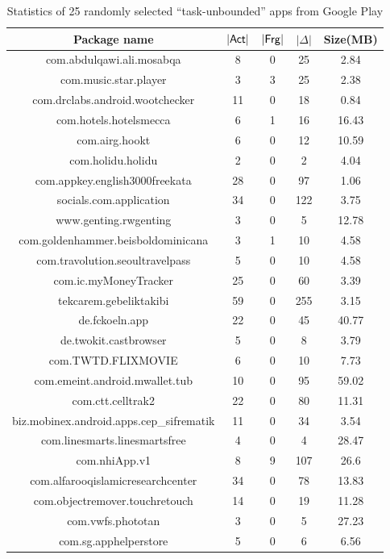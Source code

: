 	\begin{table}[htbp] 
		\begin{center}   
			\begin{tabular}{|c|c|c|c|c|}   
				\hline   \textbf{Package name} &\textbf{$|{\sf Act}|$} & \textbf{$|{\sf Frg}|$} & \textbf{$|\Delta|$} & \textbf{Size(MB)} \\   
			\hline    com.abdulqawi.ali.mosabqa & 8& 0& 25& 2.84  \\ 
			\hline    com.music.star.player & 3& 3& 25& 2.38  \\ 
			\hline     com.drclabs.android.wootchecker & 11& 0& 18& 0.84  \\ 
			\hline     com.hotels.hotelsmecca & 6& 1& 16& 16.43  \\ 
			\hline    com.airg.hookt & 6& 0& 12& 10.59  \\ 
			\hline     com.holidu.holidu & 2& 0& 2& 4.04  \\ 
			\hline    com.appkey.english3000freekata & 28& 0& 97& 1.06  \\ 
			\hline    socials.com.application & 34& 0& 122& 3.75  \\ 
			\hline     www.genting.rwgenting & 3& 0& 5& 12.78  \\ 
			\hline    com.goldenhammer.beisboldominicana & 3& 1& 10& 4.58  \\ 
			\hline     com.travolution.seoultravelpass & 5& 0& 10& 4.58  \\ 
			\hline     com.ic.myMoneyTracker & 25& 0& 60& 3.39  \\ 
			\hline     tekcarem.gebeliktakibi & 59& 0& 255& 3.15  \\ 
			\hline     de.fckoeln.app & 22& 0& 45& 40.77  \\ 
			\hline     de.twokit.castbrowser & 5& 0& 8& 3.79  \\ 
			\hline     com.TWTD.FLIXMOVIE & 6& 0& 10& 7.73  \\ 
			\hline     com.emeint.android.mwallet.tub & 10& 0& 95& 59.02  \\ 
			\hline    com.ctt.celltrak2 & 22& 0& 80& 11.31  \\ 
			\hline     biz.mobinex.android.apps.cep\_sifrematik & 11& 0& 34& 3.54  \\ 
			\hline     com.linesmarts.linesmartsfree & 4& 0& 4& 28.47  \\ 
			\hline     com.nhiApp.v1 & 8& 9& 107& 26.6  \\ 
			\hline     com.alfarooqislamicresearchcenter & 34& 0& 78& 13.83  \\ 
			\hline     com.objectremover.touchretouch & 14& 0& 19& 11.28  \\ 
			\hline     com.vwfs.phototan & 3& 0& 5& 27.23  \\ 
			\hline     com.sg.apphelperstore & 5& 0& 6& 6.56  \\ 
			\hline   
		\end{tabular}   
			\caption{Statistics of 25 randomly selected ``task-unbounded'' apps from Google Play\label{tab:t-unb-rand-gg} }
	\end{center}   
\end{table}
